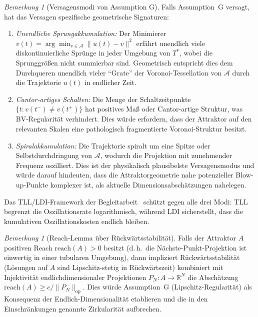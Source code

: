 \documentclass[12pt,a4paper]{article}
\theoremstyle{definition}
\theoremstyle{plain}
\theoremstyle{remark}
\newtheorem{remark}[definition]{Bemerkung}
\begin{document}
\begin{remark}[Versagensmodi von Assumption G]
\label{rem:failure-modes}
Falls Assumption~G versagt, hat das Versagen spezifische geometrische Signaturen:
\begin{enumerate}
\item \emph{Unendliche Sprungakkumulation:} Der Minimierer $v(t) = \arg\min_{v \in \mathcal{A}} \|u(t) - v\|^2$ erfährt unendlich viele diskontinuierliche Sprünge in jeder Umgebung von $T^*$, wobei die Sprunggrößen nicht summierbar sind. Geometrisch entspricht dies dem Durchqueren unendlich vieler ``Grate'' der Voronoi-Tessellation von $\mathcal{A}$ durch die Trajektorie $u(t)$ in endlicher Zeit.
\item \emph{Cantor-artiges Schalten:} Die Menge der Schaltzeitpunkte $\{t : v(t^-) \neq v(t^+)\}$ hat positives Maß oder Cantor-artige Struktur, was BV-Regularität verhindert. Dies würde erfordern, dass der Attraktor auf den relevanten Skalen eine pathologisch fragmentierte Voronoi-Struktur besitzt.
\item \emph{Spiralakkumulation:} Die Trajektorie spiralt um eine Spitze oder Selbstdurchdringung von $\mathcal{A}$, wodurch die Projektion mit zunehmender Frequenz oszilliert. Dies ist der physikalisch plausibelste Versagensmodus und würde darauf hindeuten, dass die Attraktorgeometrie nahe potenzieller Blow-up-Punkte komplexer ist, als aktuelle Dimensionsabschätzungen nahelegen.
\end{enumerate}
Das TLL/LDI-Framework der Begleitarbeit~\cite{Geiger2026-LDI} schützt gegen alle drei Modi: TLL begrenzt die Oszillationsrate logarithmisch, während LDI sicherstellt, dass die kumulativen Oszillationskosten endlich bleiben.
\end{remark}

\begin{remark}[Reach-Lemma über Rückwärtsstabilität]
\label{rem:reach-lemma}
Falls der Attraktor $A$ positiven Reach $\mathrm{reach}(A) > 0$ besitzt (d.\,h.\ die Nächste-Punkt-Projektion ist einwertig in einer tubularen Umgebung), dann impliziert Rückwärtsstabilität (Lösungen auf $A$ sind Lipschitz-stetig in Rückwärtszeit) kombiniert mit Injektivität endlichdimensionaler Projektionen $P_N: A \to \mathbb{R}^N$ die Abschätzung $\mathrm{reach}(A) \geq c/\|P_N\|_{\mathrm{op}}$. Dies würde Assumption~G (Lipschitz-Regularität) als Konsequenz der Endlich-Dimensionalität etablieren und die in den Einschränkungen genannte Zirkularität aufbrechen.
\end{remark}
\end{document}
